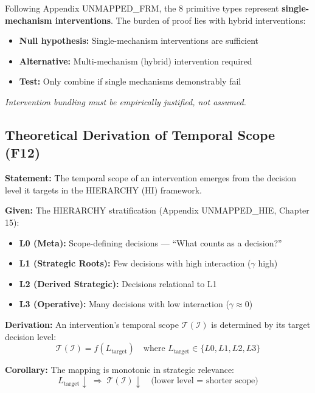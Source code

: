 \begin{tcolorbox}[colback=red!5!white, colframe=red!75!black,
    title=\textbf{Methodological Note: XVIII Exclusion Principle for Types}]
Following Appendix UNMAPPED_FRM, the 8 primitive types represent \textbf{single-mechanism interventions}. The burden of proof lies with hybrid interventions:

\begin{itemize}[nosep]
    \item \textbf{Null hypothesis:} Single-mechanism interventions are sufficient
    \item \textbf{Alternative:} Multi-mechanism (hybrid) intervention required
    \item \textbf{Test:} Only combine if single mechanisms demonstrably fail
\end{itemize}

\textit{Intervention bundling must be empirically justified, not assumed.}
\end{tcolorbox}


\subsection{Theoretical Derivation of Temporal Scope (F12)}
\label{sec:hhh-temporal}

\begin{tcolorbox}[colback=blue!5!white, colframe=blue!75!black,
    title=\textbf{Theorem HHH-T2: Temporal Scope Emergence from HIERARCHY}]

\textbf{Statement:} The temporal scope of an intervention emerges from the decision level it targets in the HIERARCHY (HI) framework.

\textbf{Given:} The HIERARCHY stratification (Appendix UNMAPPED_HIE, Chapter 15):
\begin{itemize}[nosep]
    \item \textbf{L0 (Meta):} Scope-defining decisions --- ``What counts as a decision?''
    \item \textbf{L1 (Strategic Roots):} Few decisions with high interaction ($\gamma$ high)
    \item \textbf{L2 (Derived Strategic):} Decisions relational to L1
    \item \textbf{L3 (Operative):} Many decisions with low interaction ($\gamma \approx 0$)
\end{itemize}

\textbf{Derivation:} An intervention's temporal scope $\mathcal{T}(\mathcal{I})$ is determined by its target decision level:
\begin{equation}
\mathcal{T}(\mathcal{I}) = f(L_{\text{target}}) \quad \text{where } L_{\text{target}} \in \{L0, L1, L2, L3\}
\label{eq:hhh-temporal-mapping}
\end{equation}

\textbf{Corollary:} The mapping is monotonic in strategic relevance:
\begin{equation}
L_{\text{target}} \downarrow \; \Rightarrow \; \mathcal{T}(\mathcal{I}) \downarrow \quad \text{(lower level = shorter scope)}
\end{equation}

\end{tcolorbox}

